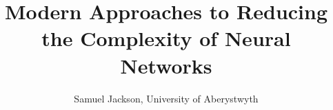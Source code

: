 \documentclass[journal]{IEEEtran}
\begin{document}
%
\title{Modern Approaches to Reducing the Complexity of Neural Networks}
%
%
%

\author{Samuel Jackson, University of Aberystwyth}

% 
%



% 




\end{document}
